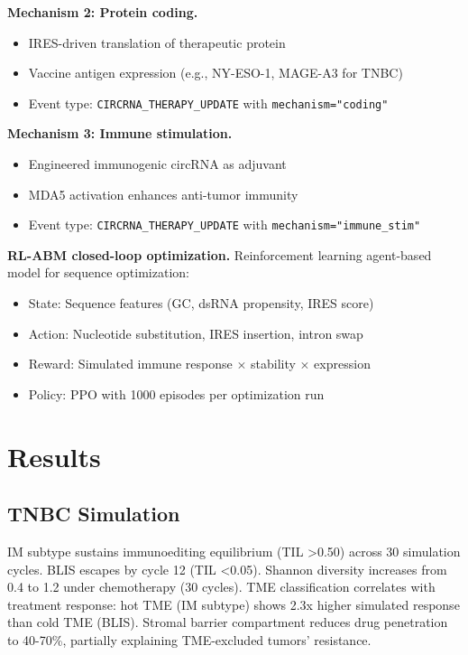 \documentclass[12pt]{article}
\begin{document}
\textbf{Mechanism 2: Protein coding.}
\begin{itemize}
\item IRES-driven translation of therapeutic protein
\item Vaccine antigen expression (e.g., NY-ESO-1, MAGE-A3 for TNBC)
\item Event type: \texttt{CIRCRNA\_THERAPY\_UPDATE} with \texttt{mechanism="coding"}
\end{itemize}

\textbf{Mechanism 3: Immune stimulation.}
\begin{itemize}
\item Engineered immunogenic circRNA as adjuvant
\item MDA5 activation enhances anti-tumor immunity
\item Event type: \texttt{CIRCRNA\_THERAPY\_UPDATE} with \texttt{mechanism="immune\_stim"}
\end{itemize}

\textbf{RL-ABM closed-loop optimization.} Reinforcement learning agent-based model for sequence optimization:
\begin{itemize}
\item State: Sequence features (GC, dsRNA propensity, IRES score)
\item Action: Nucleotide substitution, IRES insertion, intron swap
\item Reward: Simulated immune response $\times$ stability $\times$ expression
\item Policy: PPO with 1000 episodes per optimization run
\end{itemize}

\section{Results}

\subsection{TNBC Simulation}

IM subtype sustains immunoediting equilibrium (TIL >0.50) across 30 simulation cycles. BLIS escapes by cycle 12 (TIL <0.05). Shannon diversity increases from 0.4 to 1.2 under chemotherapy (30 cycles). TME classification correlates with treatment response: hot TME (IM subtype) shows 2.3x higher simulated response than cold TME (BLIS). Stromal barrier compartment reduces drug penetration to 40-70\%, partially explaining TME-excluded tumors' resistance.
\end{document}
